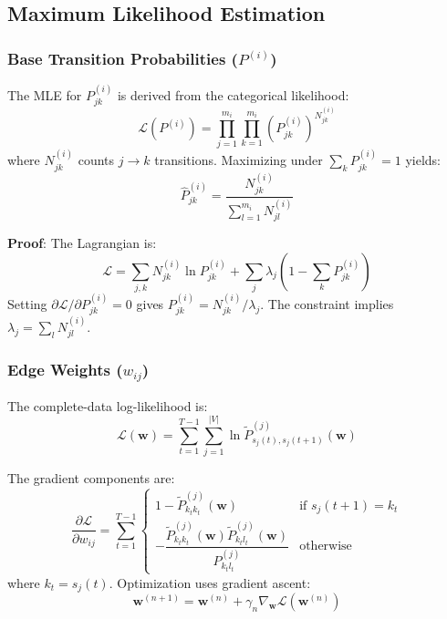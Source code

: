 \documentclass[answers,12pt,addpoints]{exam}
\begin{document}
\subsection{Maximum Likelihood Estimation}

\subsubsection{Base Transition Probabilities ($P^{(i)}$)}
The MLE for $P^{(i)}_{jk}$ is derived from the categorical likelihood:
\begin{equation}
\mathcal{L}(P^{(i)}) = \prod_{j=1}^{m_i} \prod_{k=1}^{m_i} (P^{(i)}_{jk})^{N^{(i)}_{jk}}
\end{equation}
where $N^{(i)}_{jk}$ counts $j \to k$ transitions. Maximizing under $\sum_k P^{(i)}_{jk} = 1$ yields:
\begin{equation}
\hat{P}^{(i)}_{jk} = \frac{N^{(i)}_{jk}}{\sum_{l=1}^{m_i} N^{(i)}_{jl}}
\end{equation}

\textbf{Proof}: The Lagrangian is:
\begin{equation}
\mathcal{L} = \sum_{j,k} N^{(i)}_{jk} \ln P^{(i)}_{jk} + \sum_j \lambda_j \left(1 - \sum_k P^{(i)}_{jk}\right)
\end{equation}
Setting $\partial\mathcal{L}/\partial P^{(i)}_{jk} = 0$ gives $P^{(i)}_{jk} = N^{(i)}_{jk}/\lambda_j$. The constraint implies $\lambda_j = \sum_l N^{(i)}_{jl}$.

\subsubsection{Edge Weights ($w_{ij}$)}
The complete-data log-likelihood is:
\begin{equation}
\mathcal{L}(\mathbf{w}) = \sum_{t=1}^{T-1} \sum_{j=1}^{|V|} \ln \widetilde{P}^{(j)}_{s_j(t), s_j(t+1)}(\mathbf{w})
\end{equation}

The gradient components are:
\begin{equation}
\frac{\partial \mathcal{L}}{\partial w_{ij}} = \sum_{t=1}^{T-1} 
\begin{cases} 
1 - \widetilde{P}^{(j)}_{k_t k_t}(\mathbf{w}) & \text{if } s_j(t+1) = k_t \\
-\dfrac{\widetilde{P}^{(j)}_{k_t k_t}(\mathbf{w}) \widetilde{P}^{(j)}_{k_t l_t}(\mathbf{w})}{P^{(j)}_{k_t l_t}} & \text{otherwise}
\end{cases}
\end{equation}
where $k_t = s_j(t)$. Optimization uses gradient ascent:
\begin{equation}
\mathbf{w}^{(n+1)} = \mathbf{w}^{(n)} + \gamma_n \nabla_{\mathbf{w}} \mathcal{L}(\mathbf{w}^{(n)})
\end{equation}
\end{document}
